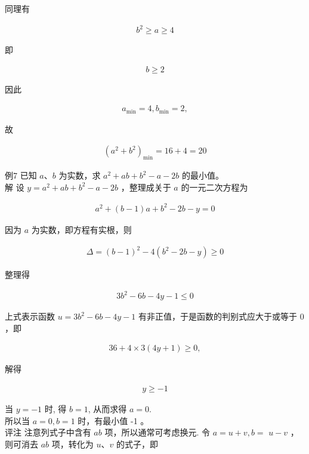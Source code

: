 \documentclass[10pt]{article}
\begin{document}
同理有

\begin{align*}
b^{2} \geqslant a \geqslant 4
\end{align*}

即

\begin{align*}
b \geqslant 2
\end{align*}

因此

\begin{align*}
a_{\min }=4, b_{\min }=2,
\end{align*}

故

\begin{align*}
\left(a^{2}+b^{2}\right)_{\min }=16+4=20
\end{align*}

例7 已知 $a 、 b$ 为实数，求 $a^{2}+a b+b^{2}-a-2 b$ 的最小值。\\
解 设 $y=a^{2}+a b+b^{2}-a-2 b$ ，整理成关于 $a$ 的一元二次方程为

\begin{align*}
a^{2}+(b-1) a+b^{2}-2 b-y=0
\end{align*}

因为 $a$ 为实数，即方程有实根，则

\begin{align*}
\Delta=(b-1)^{2}-4\left(b^{2}-2 b-y\right) \geqslant 0
\end{align*}

整理得

\begin{align*}
3 b^{2}-6 b-4 y-1 \leqslant 0
\end{align*}

上式表示函数 $u=3 b^{2}-6 b-4 y-1$ 有非正值，于是函数的判别式应大于或等于 0 ，即

\begin{align*}
36+4 \times 3(4 y+1) \geqslant 0,
\end{align*}

解得

\begin{align*}
y \geqslant-1
\end{align*}

当 $y=-1$ 时, 得 $b=1$, 从而求得 $a=0$.\\
所以当 $a=0, b=1$ 时，有最小值 -1 。\\
评注 注意列式子中含有 $a b$ 项，所以通常可考虑换元. 令 $a=u+v, b=$ $u-v$ ，则可消去 $a b$ 项，转化为 $u 、 v$ 的式子，即
\end{document}
